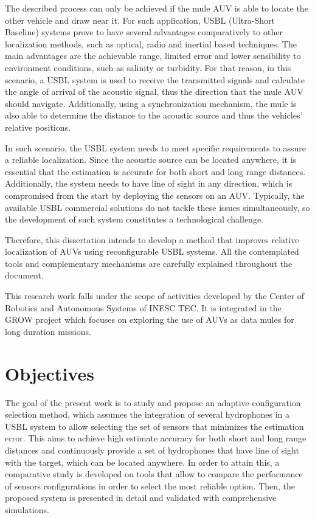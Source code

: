 The described process can only be achieved if the mule AUV is able to locate the other vehicle and draw near it. For such application, USBL (Ultra-Short Baseline) systems prove to have several advantages comparatively to other localization methods, such as optical, radio and inertial based techniques. The main advantages are the achievable range, limited error and lower sensibility to environment conditions, such as salinity or turbidity. For that reason, in this scenario, a USBL system is used to receive the transmitted signals and calculate the angle of arrival of the acoustic signal, thus the direction that the mule AUV should navigate. Additionally, using a synchronization mechanism, the mule is also able to determine the distance to the acoustic source and thus the vehicles' relative positions.

In such scenario, the USBL system needs to meet specific requirements to assure a reliable localization. Since the acoustic source can be located anywhere, it is essential that the estimation is accurate for both short and long range distances. Additionally, the system needs to have line of sight in any direction, which is compromised from the start by deploying the sensors on an AUV. Typically, the available USBL commercial solutions do not tackle these issues simultaneously, so the development of such system constitutes a technological challenge.

Therefore, this dissertation intends to develop a method that improves relative localization of AUVs using reconfigurable USBL systems. All the contemplated tools and complementary mechanisms are carefully explained throughout the document. 

This research work falls under the scope of activities developed by the Center of Robotics and Autonomous Systems of INESC TEC. It is integrated in the GROW project which focuses on exploring the use of AUVs as data mules for long duration missions.

\section{Objectives} \label{sec:objective}

The goal of the present work is to study and propose an adaptive configuration selection method, which assumes the integration of several hydrophones in a USBL system to allow selecting the set of sensors that minimizes the estimation error. This aims to achieve high estimate accuracy for both short and long range distances and continuously provide a set of hydrophones that have line of sight with the target, which can be located anywhere. In order to attain this, a comparative study is developed on tools that allow to compare the performance of sensors configurations in order to select the most reliable option. Then, the proposed system is presented in detail and validated with comprehensive simulations.

